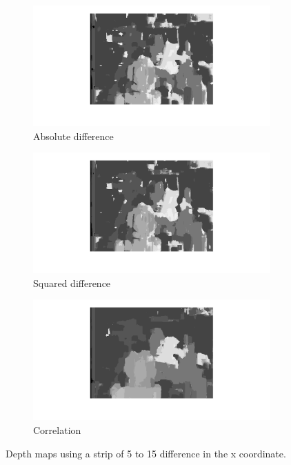 \documentclass{article}
\begin{document}
\begin{figure}[ht!]
 \centering
 \begin{subfigure}{.8\textwidth}
  \centering
  \includegraphics[width=1\linewidth]{abs_patch15.png}
  \caption{Absolute difference}
  \label{fig2a}
 \end{subfigure}
 \begin{subfigure}{.8\textwidth}
  \centering
  \includegraphics[width=1\linewidth]{squared_patch15.png}
  \caption{Squared difference}
  \label{fig2b}
 \end{subfigure}
 \begin{subfigure}{.8\textwidth}
  \centering
  \includegraphics[width=\linewidth]{corr_patch15.png}
  \caption{Correlation}
  \label{fig2c}
 \end{subfigure}
 \caption{Depth maps using a strip of 5 to 15 difference in the x coordinate.}
 \label{fig2}
\end{figure}
\end{document}
